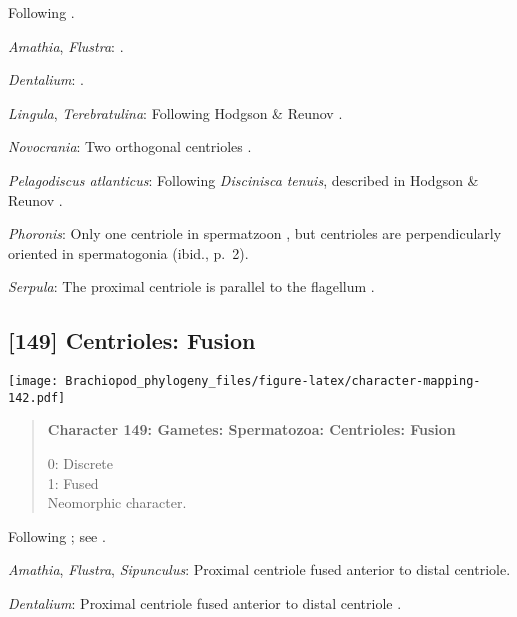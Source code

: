 \documentclass[openany]{book}
\theoremstyle{definition}
\theoremstyle{definition}
\theoremstyle{definition}
\theoremstyle{remark}
\begin{document}
Following \citet{Hodgson1994Ultrastructureof}.

\hypertarget{Amathia-coding-148}{}
\emph{Amathia}, \emph{Flustra}: \citep{Franzen1981}.

\hypertarget{Dentalium-coding-148}{}
\emph{Dentalium}: \citet{DufresneDube1983}.

\hypertarget{Lingula-coding-148}{}
\emph{Lingula}, \emph{Terebratulina}: Following Hodgson \& Reunov
\citeyearpar{Hodgson1994Ultrastructureof}.

\hypertarget{Novocrania-coding-148}{}
\emph{Novocrania}: Two orthogonal centrioles
\citep{Afzelius1978Finestructure}.

\hypertarget{Pelagodiscus_atlanticus-coding-148}{}
\emph{Pelagodiscus atlanticus}: Following \emph{Discinisca}
\emph{tenuis}, described in Hodgson \& Reunov
\citeyearpar{Hodgson1994Ultrastructureof}.

\hypertarget{Phoronis-coding-148}{}
\emph{Phoronis}: Only one centriole in spermatzoon
\citep[p.~7]{Reunov2004Ultrastructuralstudy}, but centrioles are
perpendicularly oriented in spermatogonia (ibid., p.~2).

\hypertarget{Serpula-coding-148}{}
\emph{Serpula}: The proximal centriole is parallel to the flagellum
\citep{Gherardi2011}.

\subsection*{{[}149{]} Centrioles: Fusion}\label{centrioles-fusion}

\texttt{[image: Brachiopod\_phylogeny\_files/figure-latex/character-mapping-142.pdf]}

\begin{quote}
\textbf{Character 149: Gametes: Spermatozoa: Centrioles: Fusion}

0: Discrete\\
1: Fused\\
Neomorphic character.
\end{quote}

Following \citet{Smith2012}; see \citet{BucklandNicks2008}.

\hypertarget{Amathia-coding-149}{}
\emph{Amathia}, \emph{Flustra}, \emph{Sipunculus}: Proximal centriole
fused anterior to distal centriole.

\hypertarget{Dentalium-coding-149}{}
\emph{Dentalium}: Proximal centriole fused anterior to distal centriole
\citep{DufresneDube1983}.
\end{document}
